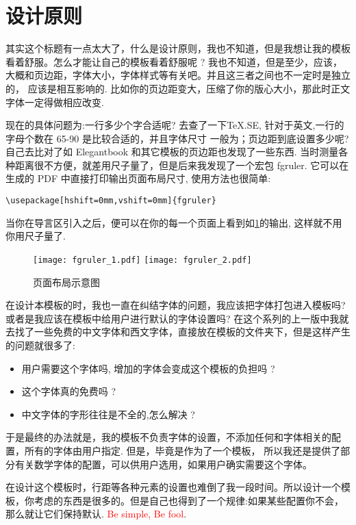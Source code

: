 \documentclass[
  hyper,    
  lang=cn,
  class=book,
  mathSpec={envStyle=leftbar, alias},
  toc={redef}
]{zlatex}
\let\cmd\zlatexVerb
\begin{document}
\section{设计原则}
其实这个标题有一点太大了，什么是设计原则，我也不知道，但是我想让我的模板看着舒服。怎么才能让自己的模板看着舒服呢 ?
我也不知道，但是至少，应该，大概和页边距，字体大小，字体样式等有关吧。并且这三者之间也不一定时是独立的，
应该是相互影响的. 比如你的页边距变大，压缩了你的版心大小，那此时正文字体一定得做相应改变. 

现在的具体问题为:一行多少个字合适呢? 去查了一下\TeX.SE, 针对于英文,一行的字母个数在 65-90 是比较合适的，并且字体尺寸
一般为\cmd{10pt,11pt,12pt}；页边距到底设置多少呢? 自己去比对了如 Elegantbook 和其它模板的页边距也发现了一些东西. 
当时测量各种距离很不方便，就差用尺子量了，但是后来我发现了一个宏包 fgruler. 它可以在生成的 PDF 中直接打印输出页面布局尺寸,
使用方法也很简单:

\begin{verbatim}
\usepackage[hshift=0mm,vshift=0mm]{fgruler}
\end{verbatim}

当你在导言区引入之后，便可以在你的每一个页面上看到如\cref{fig:fgruler-example}的输出, 这样就不用你用尺子量了.

\begin{figure}[!htb]
    \centering
    \texttt{[image: fgruler\_1.pdf]}
    \texttt{[image: fgruler\_2.pdf]}
    \caption{页面布局示意图}
    \label{fig:fgruler-example}
\end{figure}

在设计本模板的时，我也一直在纠结字体的问题，我应该把字体打包进入模板吗? 或者是我应该在模板中给用户进行默认的字体设置吗?
在这个系列的上一版中我就去找了一些免费的中文字体和西文字体，直接放在模板的文件夹下，但是这样产生的问题就很多了:

\begin{itemize}
    \item 用户需要这个字体吗, 增加的字体会变成这个模板的负担吗 ?
    \item 这个字体真的免费吗 ?
    \item 中文字体的字形往往是不全的,怎么解决 ? 
\end{itemize}

于是最终的办法就是，我的模板不负责字体的设置，不添加任何和字体相关的配置，所有的字体由用户指定. 但是，毕竟是作为了一个模板，
所以我还是提供了部分有关数学字体的配置，可以供用户选用，如果用户确实需要这个字体。

在设计这个模板时，行距等各种元素的设置也难倒了我一段时间。所以设计一个模板，你考虑的东西是很多的。但是自己也得到了一个规律:如果某些配置你不会，
那么就让它们保持默认. \textcolor{red}{Be simple, Be fool}.
\end{document}
